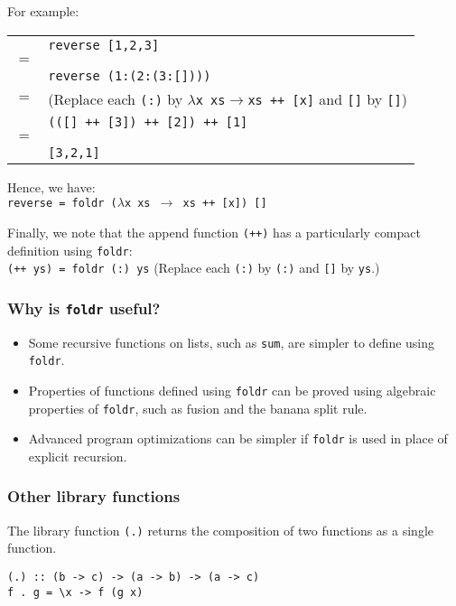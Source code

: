 \begin{multicols}{2}
For example:\\
\begin{tabularx}{\linewidth}{lX}
  & \lstinline{reverse [1,2,3]}\\
  \(=\) & \\
  & \lstinline{reverse (1:(2:(3:[])))}\\
  \(=\) & \tiny{(Replace each \lstinline{(:)} by \(\lambda\)\lstinline{x xs}\(\rightarrow\)\lstinline{xs ++ [x]} and \lstinline{[]} by \lstinline{[]})}\\
  & \lstinline{(([] ++ [3]) ++ [2]) ++ [1]}\\
  \(=\) & \\
  & \lstinline{[3,2,1]}\\
\end{tabularx}

Hence, we have:\\
\lstinline{reverse = foldr (}\(\lambda\)\lstinline{x xs }\(\rightarrow\)\lstinline{ xs ++ [x]) []}

Finally, we note that the append function \lstinline{(++)} has a particularly compact definition using \lstinline{foldr}:\\
\lstinline{(++ ys) = foldr (:) ys} {\tiny{(Replace each \lstinline{(:)} by \lstinline{(:)} and \lstinline{[]} by \lstinline{ys}.)}}

\subsubsection{Why is \lstinline{foldr} useful?}
\begin{itemize}
  \item Some recursive functions on lists, such as \lstinline{sum}, are simpler to define using \lstinline{foldr}.
  \item Properties of functions defined using \lstinline{foldr} can be proved using algebraic properties of \lstinline{foldr}, such as fusion and the banana split rule.
  \item Advanced program optimizations can be simpler if \lstinline{foldr} is used in place of explicit recursion.
\end{itemize}

\subsubsection{Other library functions}
The library function \lstinline{(.)} returns the composition of two functions as a single function.
\begin{lstlisting}
(.) :: (b -> c) -> (a -> b) -> (a -> c)
f . g = \x -> f (g x)
\end{lstlisting}


\end{multicols}
